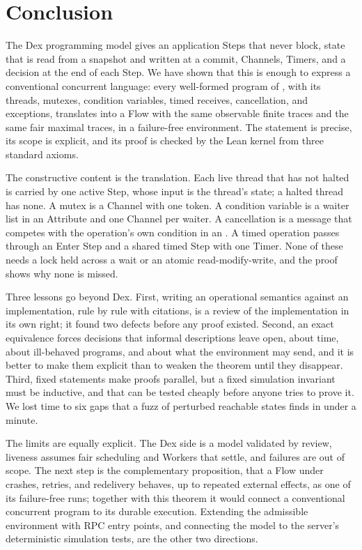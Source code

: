 \section{Conclusion}
\label{sec:conclusion}

The Dex programming model gives an application Steps that never block,
state that is read from a snapshot and written at a commit, Channels,
Timers, and a decision at the end of each Step. We have shown that this is
enough to express a conventional concurrent language: every well-formed
program of \Lang{}, with its threads, mutexes, condition variables, timed
receives, cancellation, and exceptions, translates into a Flow with the
same observable finite traces and the same fair maximal traces, in a
failure-free environment. The statement is precise, its scope is explicit,
and its proof is checked by the Lean kernel from three standard axioms.

The constructive content is the translation. Each live thread that has not
halted is carried by one active Step, whose input is the thread's state; a
halted thread has none. A mutex is a Channel with one token. A
condition variable is a waiter list in an Attribute and one Channel per
waiter. A cancellation is a message that competes with the operation's own
condition in an . A timed operation passes through an Enter Step
and a shared timed Step with one Timer.
None of these needs a lock held across a wait or an atomic
read-modify-write, and the proof shows why none is missed.

Three lessons go beyond Dex. First, writing an operational semantics
against an implementation, rule by rule with citations, is a review of the
implementation in its own right; it found two defects before any proof
existed. Second, an exact equivalence forces decisions that informal
descriptions leave open, about time, about ill-behaved programs, and about
what the environment may send, and it is better to make them explicit than
to weaken the theorem until they disappear. Third, fixed statements make
proofs parallel, but a fixed simulation invariant must be inductive, and
that can be tested cheaply before anyone tries to prove it. We lost time to
six gaps that a fuzz of perturbed reachable states finds in under a
minute.

The limits are equally explicit. The Dex side is a model validated by
review, liveness assumes fair scheduling and Workers that settle, and
failures are out of scope. The next step is the complementary proposition,
that a Flow under crashes, retries, and redelivery behaves, up to repeated
external effects, as one of its failure-free runs; together with this
theorem it would connect a
conventional concurrent program to its durable execution. Extending the
admissible environment with RPC entry points, and connecting the model to
the server's deterministic simulation tests, are the other two directions.
